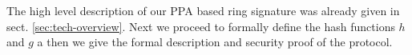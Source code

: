 
The high level description of our PPA based ring signature was already given in sect. \ref{sec:tech-overview}. Next we proceed to formally define the hash functions $h$ and $g$ a then we give the formal description and security proof of the protocol. %





